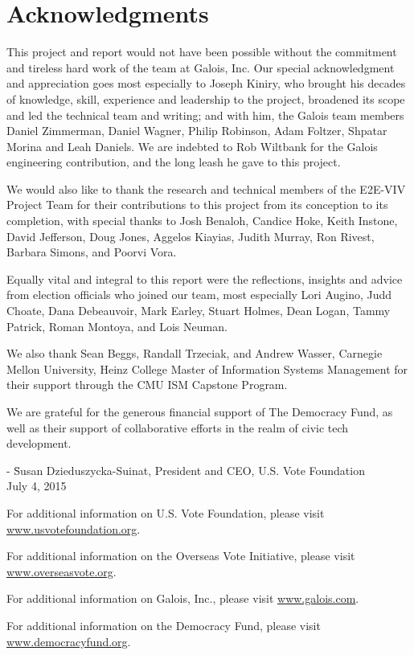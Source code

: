 \chapter*{Acknowledgments}
\label{chapter:acknowledgments}

This project and report would not have been possible without the
commitment and tireless hard work of the team at Galois, Inc. Our
special acknowledgment and appreciation goes most especially to
Joseph Kiniry, who brought his decades of knowledge, skill, experience
and leadership to the project, broadened its scope and led the
technical team and writing; and with him, the Galois team members
Daniel Zimmerman, Daniel Wagner, Philip Robinson, Adam Foltzer,
Shpatar Morina and Leah Daniels. We are indebted to Rob Wiltbank for
the Galois engineering contribution, and the long leash he gave to
this project. 

We would also like to thank the research and technical members of the
E2E-VIV Project Team for their contributions to this project from its
conception to its completion, with special thanks to Josh Benaloh,
Candice Hoke, Keith Instone, David Jefferson, Doug Jones, Aggelos
Kiayias, Judith Murray, Ron Rivest, Barbara Simons, and Poorvi Vora. 

Equally vital and integral to this report were the reflections,
insights and advice from election officials who joined our team, most
especially Lori Augino, Judd Choate, Dana Debeauvoir, Mark Earley,
Stuart Holmes, Dean Logan, Tammy Patrick, Roman Montoya, and Lois
Neuman.

We also thank Sean Beggs, Randall Trzeciak, and Andrew Wasser,
Carnegie Mellon University, Heinz College Master of Information
Systems Management for their support through the CMU ISM Capstone
Program. 

We are grateful for the generous financial support of The Democracy
Fund, as well as their support of collaborative efforts in the realm
of civic tech development. 

\begin{tabbing}
- \= Susan Dzieduszycka-Suinat, President and CEO, U.S. Vote
Foundation \\
\> July 4, 2015
\end{tabbing}

\vspace{\fill}

For additional information on U.S. Vote Foundation, please visit
\url{www.usvotefoundation.org}.   

For additional information on the Overseas Vote Initiative, please
visit \url{www.overseasvote.org}. 

For additional information on Galois, Inc., please visit
\url{www.galois.com}.

For additional information on the Democracy Fund, please visit
\url{www.democracyfund.org}.

